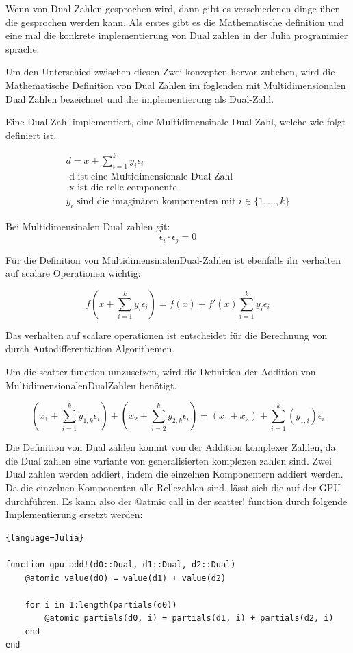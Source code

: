 Wenn von Dual-Zahlen gesprochen wird, dann gibt es verschiedenen dinge über die gesprochen werden kann.
Als erstes gibt es die Mathematische definition und eine mal die konkrete implementierung von Dual zahlen in der Julia programmier sprache.

Um den Unterschied zwischen diesen Zwei konzepten hervor zuheben,
wird die Mathematische Definition von Dual Zahlen im foglenden mit Multidimensionalen Dual Zahlen bezeichnet
und die implementierung als Dual-Zahl.

Eine Dual-Zahl implementiert, eine Multidimensinale Dual-Zahl, welche wie folgt definiert ist.

\begin{gather*}
 d = x + \sum_{i = 1}^{k} y_i \epsilon_i \\
	\text{ d ist eine Multidimensionale Dual Zahl } \\
	\text{ x ist die relle componente } \\
	y_i \text{ sind die imaginären komponenten mit } i \in \{1, ..., k\}
\end{gather*}

Bei Multidimensinalen Dual zahlen git:
$$
 \epsilon_i \cdot \epsilon_j = 0
$$

Für die Definition von MultidimensinalenDual-Zahlen ist ebenfalls ihr verhalten auf scalare Operationen wichtig:

$$
 f( x + \sum_{i = 1}^{k} y_i \epsilon_i  ) = f(x) +  f'(x) \sum_{i = 1}^{k} y_i \epsilon_i
$$
\cite{juliaForwardDiffPackage}

Das verhalten auf scalare operationen ist entscheidet für die Berechnung von durch Autodifferentiation Algorithemen.

Um die scatter-function umzusetzen, wird die Definition der Addition von MultidimensionalenDualZahlen \cite{RecentAdvances} benötigt.

$$
(x_1 + \sum_{i = 1}^{k} y_{1,k} \epsilon_i) + ( x_2 + \sum_{i = 2}^{k} y_{2,k} \epsilon_i) = (x_1 + x_2) + \sum_{i = 1}^{k} (y_{1, i}) \epsilon_i
$$

Die Definition von Dual zahlen kommt von der Addition komplexer Zahlen, 
da die Dual zahlen eine variante von generalisierten komplexen zahlen sind.
Zwei Dual zahlen werden addiert, indem die einzelnen Komponentern addiert werden.
Da die einzelnen Komponenten  alle Rellezahlen sind, lässt sich die auf der GPU durchführen.
Es kann also der @atmic call in der scatter! function durch folgende Implementierung ersetzt werden:

\begin{lstlisting}{language=Julia}

function gpu_add!(d0::Dual, d1::Dual, d2::Dual)
	@atomic value(d0) = value(d1) + value(d2)
	
	for i in 1:length(partials(d0))
		@atomic partials(d0, i) = partials(d1, i) + partials(d2, i)
	end
end

\end{lstlisting}

